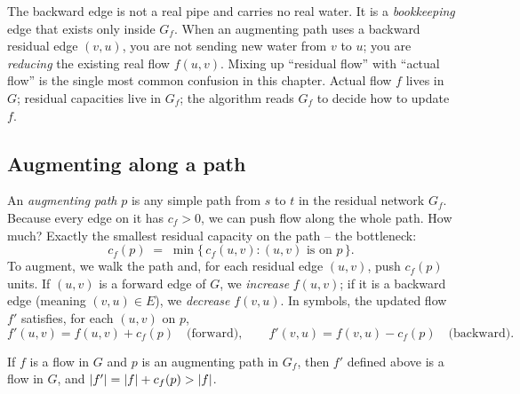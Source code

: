 \begin{trapbox}
The backward edge is not a real pipe and carries no real water. It is a
\emph{bookkeeping} edge that exists only inside $G_f$. When an augmenting path
uses a backward residual edge $(v,u)$, you are not sending new water from $v$ to
$u$; you are \emph{reducing} the existing real flow $f(u,v)$. Mixing up
``residual flow'' with ``actual flow'' is the single most common confusion in
this chapter. Actual flow $f$ lives in $G$; residual capacities live in $G_f$;
the algorithm reads $G_f$ to decide how to update $f$.
\end{trapbox}

\subsection{Augmenting along a path}

An \emph{augmenting path} $p$ is any simple path from $s$ to $t$ in the residual
network $G_f$. Because every edge on it has $c_f > 0$, we can push flow along
the whole path. How much? Exactly the smallest residual capacity on the path --
the bottleneck:
\[
  c_f(p) \;=\; \min\{\, c_f(u,v) : (u,v) \text{ is on } p \,\}.
\]
To augment, we walk the path and, for each residual edge $(u,v)$, push $c_f(p)$
units. If $(u,v)$ is a forward edge of $G$, we \emph{increase} $f(u,v)$; if it
is a backward edge (meaning $(v,u) \in E$), we \emph{decrease} $f(v,u)$. In
symbols, the updated flow $f'$ satisfies, for each $(u,v)$ on $p$,
\[
  f'(u,v) = f(u,v) + c_f(p) \quad\text{(forward)},
  \qquad
  f'(v,u) = f(v,u) - c_f(p) \quad\text{(backward)}.
\]

\begin{lemma}
\label{ch26:lemma-valid}
If $f$ is a flow in $G$ and $p$ is an augmenting path in $G_f$, then $f'$
defined above is a flow in $G$, and $\lvert f'\rvert = \lvert f\rvert + c_f(p) > \lvert f\rvert$.
\end{lemma}

